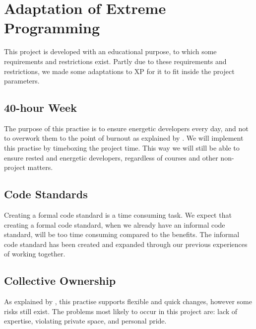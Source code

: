 \section{Adaptation of Extreme Programming}
This project is developed with an educational purpose, to which some requirements and restrictions exist.
Partly due to these requirements and restrictions, we made some adaptations to XP for it to fit inside the project parameters.

\subsection{40-hour Week}
The purpose of this practise is to ensure energetic developers every day, and not to overwork them to the point of burnout as explained by \citet[p. 58]{xp:explored}.
We will implement this practise by timeboxing the project time.
This way we will still be able to ensure rested and energetic developers, regardless of courses and other non-project matters.


\subsection{Code Standards}
Creating a formal code standard is a time consuming task.
We expect that creating a formal code standard, when we already have an informal code standard, will be too time consuming compared to the benefits.
The informal code standard has been created and expanded through our previous experiences of working together.

\subsection{Collective Ownership}
As explained by \citet[p. 54]{xp:explored}, this practise supports flexible and quick changes, however some risks still exist.
The problems most likely to occur in this project are: lack of expertise, violating private space, and personal pride.

